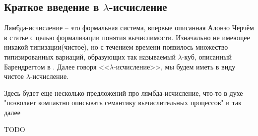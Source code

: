 \subsection{Краткое введение в \texorpdfstring{$\lambda$}{лямбда}-исчисление}
\label{sec:lambda}

Лямбда-исчисление -- это формальная система, впервые описанная Алонзо Черчём в статье \cite{church1936unsolvable} с целью формализации понятия вычислимости. Изначально не имеющее никакой типизации(чистое), но с течением времени появилось множество типизированных вариаций, образующих так называемый $\lambda$-куб, описанный Барендрегтом в \cite{barendregt1993lambda}. Далее говоря <<$\lambda$-исчисление>>, мы будем иметь в виду чистое $\lambda$-исчисление.

Здесь будет еще несколько предложений про лямбда-исчисление, что-то в духе "позволяет компактно описывать семантику вычислительных процессов" и так далее

TODO
